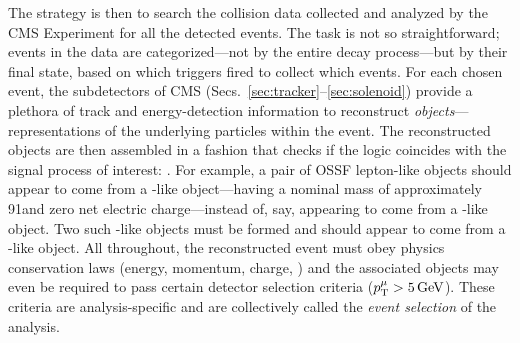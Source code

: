 The strategy is then to search the \pp collision data collected and analyzed by the CMS Experiment for all the detected \hzzfourl events.
The task is not so straightforward;
events in the data are categorized---not by the entire decay process---but by their final state, based on which triggers fired to collect which events.
For each chosen event, the subdetectors of CMS (Secs.~\ref{sec:tracker}--\ref{sec:solenoid}) provide a plethora of track and energy-detection information to reconstruct \emph{objects}---representations of the underlying particles within the event.
The reconstructed objects are then assembled in a fashion that checks if the logic coincides with the signal process of interest: \hzzfourl.  %
For example, a pair of OSSF lepton-like objects should appear to come from a \PZ-like object---\ie having a nominal mass of approximately 91\GeV and zero net electric charge---instead of, say, appearing to come from a \PH-like object.
Two such \PZ-like objects must be formed and should appear to come from a \PH-like object.
All throughout, the reconstructed event must obey physics conservation laws (energy, momentum, charge, \etc) and the associated objects may even be required to pass certain detector selection criteria (\eg $p_{\mathrm{T}}^\mu > 5\,\text{Ge\hspace{-.08em}V}$).
These criteria are analysis-specific and are collectively called the \emph{event selection} of the analysis.

